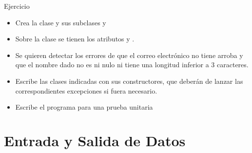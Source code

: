 \documentclass[10pt, envcountsect , spanish]{beamer}
\begin{document}
\begin{frame}{Ejercicio} 

\begin{ejercicio}{}


\begin{itemize}
\item Crea la clase  y sus subclases  y  

\item Sobre la clase  se tienen los atributos  y  .

\item Se quieren detectar los errores de que el correo electrónico no tiene arroba  y que el nombre dado no es ni nulo ni tiene una longitud inferior a 3 caracteres.

\item Escribe las clases indicadas con sus constructores, que deberán de lanzar las correspondientes excepciones si fuera necesario.

\item Escribe el programa para una prueba unitaria
\end{itemize}

\end{ejercicio}

\end{frame}






\section{Entrada y Salida de Datos}
\end{document}
